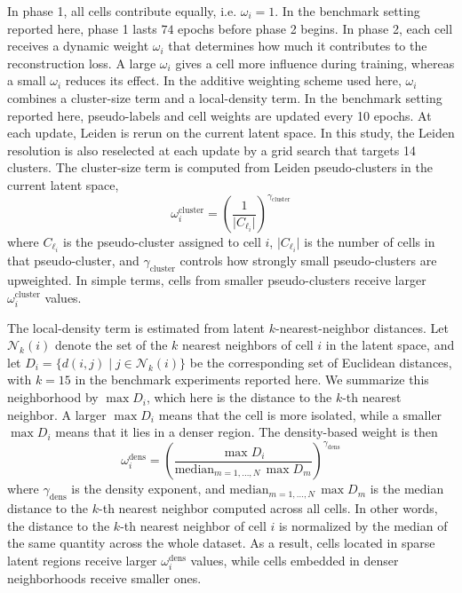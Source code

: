 \documentclass[11pt,a4paper]{article}
\begin{document}
In phase 1, all cells contribute equally, i.e. $\omega_i = 1$. In the
benchmark setting reported here, phase 1 lasts $74$ epochs before
phase 2 begins. In phase 2, each cell receives a dynamic weight $\omega_i$ that determines
how much it contributes to the reconstruction loss. A large $\omega_i$
gives a cell more influence during training, whereas a small
$\omega_i$ reduces its effect. In the additive weighting scheme used here,
$\omega_i$ combines a cluster-size term and a local-density term.
In the benchmark setting reported here, pseudo-labels and cell weights
are updated every 10 epochs. At each update, Leiden is rerun on the
current latent space. In this study, the Leiden resolution is also
reselected at each update by a grid search that targets 14 clusters.
The cluster-size term is computed from Leiden pseudo-clusters in the
current latent space,
\begin{equation}
  \omega^{\mathrm{cluster}}_i
  =
  \left( \frac{1}{\lvert C_{\ell_i} \rvert} \right)^{\gamma_{\mathrm{cluster}}}
\end{equation}
where $C_{\ell_i}$ is the pseudo-cluster assigned to cell $i$,
$\lvert C_{\ell_i} \rvert$ is the number of cells in that
pseudo-cluster, and $\gamma_{\mathrm{cluster}}$ controls how strongly
small pseudo-clusters are upweighted. In simple terms, cells from
smaller pseudo-clusters receive larger $\omega^{\mathrm{cluster}}_i$
values.

The local-density term is estimated from latent
$k$-nearest-neighbor distances. Let $\mathcal{N}_k(i)$ denote the set
of the $k$ nearest neighbors of cell $i$ in the latent space, and let
$D_i = \{d(i,j) \mid j \in \mathcal{N}_k(i)\}$ be the corresponding set
of Euclidean distances, with $k=15$ in the benchmark experiments reported
here. We
summarize this neighborhood by $\max D_i$, which here is the distance
to the $k$-th nearest neighbor. A larger $\max D_i$ means that the cell
is more isolated, while a smaller $\max D_i$ means that it lies in a
denser region. The density-based weight is then
\begin{equation}
  \omega^{\mathrm{dens}}_i
  =
  \left(
    \frac{\max D_i}{\mathrm{median}_{m=1,\ldots,N}\, \max D_m}
  \right)^{\gamma_{\mathrm{dens}}}
\end{equation}
where $\gamma_{\mathrm{dens}}$ is the density exponent, and
$\mathrm{median}_{m=1,\ldots,N}\, \max D_m$ is the median distance to
the $k$-th nearest neighbor computed across all cells. In other words,
the distance to the $k$-th nearest neighbor of cell $i$ is normalized
by the median of the same quantity across the whole dataset. As a
result, cells located in sparse latent
regions receive larger $\omega^{\mathrm{dens}}_i$ values, while cells
embedded in denser neighborhoods receive smaller ones.
\end{document}
